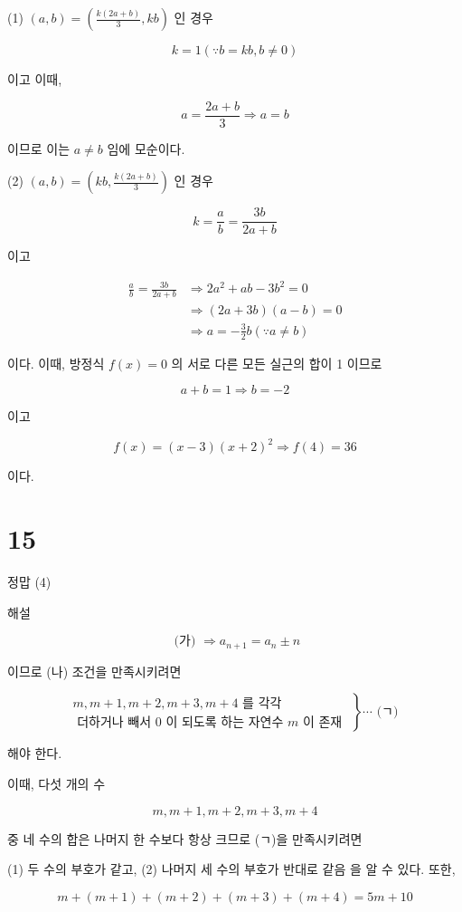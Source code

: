 \documentclass[10pt]{article}
\begin{document}
(1) \((a, b)=\left(\frac{k(2 a+b)}{3}, k b\right)\) 인 경우

\[
k=1(\because b=k b, b \neq 0)
\]

이고 이때,

\[
a=\frac{2 a+b}{3} \Rightarrow a=b
\]

이므로 이는 \(a \neq b\) 임에 모순이다.

(2) \((a, b)=\left(k b, \frac{k(2 a+b)}{3}\right)\) 인 경우

\[
k=\frac{a}{b}=\frac{3 b}{2 a+b}
\]

이고

\[
\begin{aligned}
\frac{a}{b}=\frac{3 b}{2 a+b} & \Rightarrow 2 a^{2}+a b-3 b^{2}=0 \\
& \Rightarrow(2 a+3 b)(a-b)=0 \\
& \Rightarrow a=-\frac{3}{2} b(\because a \neq b)
\end{aligned}
\]

이다. 이때, 방정식 \(f(x)=0\) 의 서로 다른 모든 실근의 합이 1 이므로

\[
a+b=1 \Rightarrow b=-2
\]

이고

\[
f(x)=(x-3)(x+2)^{2} \Rightarrow f(4)=36
\]

이다.

\section*{15}
정맙 (4)

해설

\[
\text { (가) } \Rightarrow a_{n+1}=a_{n} \pm n
\]

이므로 (나) 조건을 만족시키려면

\[
\left.\begin{array}{l}
m, m+1, m+2, m+3, m+4 \text { 를 각각 } \\
\text { 더하거나 빼서 } 0 \text { 이 되도록 하는 자연수 } m \text { 이 존재 }
\end{array}\right\} \cdots \text { (ㄱ) }
\]

해야 한다.

이때, 다섯 개의 수

\[
m, m+1, m+2, m+3, m+4
\]

중 네 수의 합은 나머지 한 수보다 항상 크므로 (ㄱ)을 만족시키려면

(1) 두 수의 부호가 같고, (2) 나머지 세 수의 부호가 반대로 같음 을 알 수 있다. 또한,

\[
m+(m+1)+(m+2)+(m+3)+(m+4)=5 m+10
\]
\end{document}
